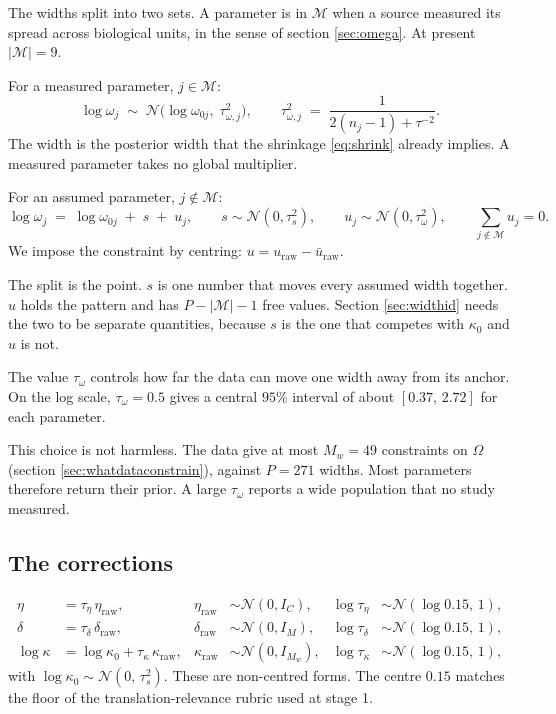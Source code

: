 \documentclass[11pt]{article}
\newcommand{\Ncal}{\mathcal{N}}
\newcommand{\Mset}{\mathcal{M}}
\begin{document}
The widths split into two sets. A parameter is in $\Mset$ when a source measured
its spread across biological units, in the sense of section \ref{sec:omega}. At
present $|\Mset|=9$.

For a measured parameter, $j\in\Mset$:
\begin{equation}
\log\omega_j \;\sim\; \Ncal\big(\log\omega_{0j},\;\tau_{\omega,j}^2\big),
\qquad
\tau_{\omega,j}^2 \;=\; \frac{1}{2(n_j-1)+\tau^{-2}} .
\label{eq:omegameas}
\end{equation}
The width is the posterior width that the shrinkage \eqref{eq:shrink} already
implies. A measured parameter takes no global multiplier.

For an assumed parameter, $j\notin\Mset$:
\begin{equation}
\log\omega_j \;=\; \log\omega_{0j} \;+\; s \;+\; u_j,
\qquad
s\sim\Ncal(0,\tau_s^2),
\qquad
u_j\sim\Ncal(0,\tau_\omega^2),
\qquad
\sum_{j\notin\Mset} u_j = 0 .
\label{eq:omegaprior}
\end{equation}
We impose the constraint by centring: $u = u_{\text{raw}} - \bar u_{\text{raw}}$.

The split is the point. $s$ is one number that moves every assumed width
together. $u$ holds the pattern and has $P-|\Mset|-1$ free values. Section
\ref{sec:widthid} needs the two to be separate quantities, because $s$ is the one
that competes with $\kappa_0$ and $u$ is not.

The value $\tau_\omega$ controls how far the data can move one width away from
its anchor. On the log scale, $\tau_\omega=0.5$ gives a central $95\%$ interval
of about $[0.37,\,2.72]$ for each parameter.

This choice is not harmless. The data give at most $M_w=49$ constraints on
$\Omega$ (section \ref{sec:whatdataconstrain}), against $P=271$ widths. Most
parameters therefore return their prior. A large $\tau_\omega$ reports a wide
population that no study measured.

\subsection{The corrections}

\begin{align}
\eta &= \tau_\eta\,\eta_{\text{raw}}, &
\eta_{\text{raw}} &\sim\Ncal(0,I_C), &
\log\tau_\eta &\sim\Ncal(\log 0.15,\,1),\\
\delta &= \tau_\delta\,\delta_{\text{raw}}, &
\delta_{\text{raw}} &\sim\Ncal(0,I_M), &
\log\tau_\delta &\sim\Ncal(\log 0.15,\,1),\\
\log\kappa &= \log\kappa_0 + \tau_\kappa\,\kappa_{\text{raw}}, &
\kappa_{\text{raw}} &\sim\Ncal(0,I_{M_w}), &
\log\tau_\kappa &\sim\Ncal(\log 0.15,\,1),
\end{align}
with $\log\kappa_0\sim\Ncal(0,\,\tau_s^2)$. These are non-centred forms. The
centre $0.15$ matches the floor of the translation-relevance rubric used at
stage 1.
\end{document}

